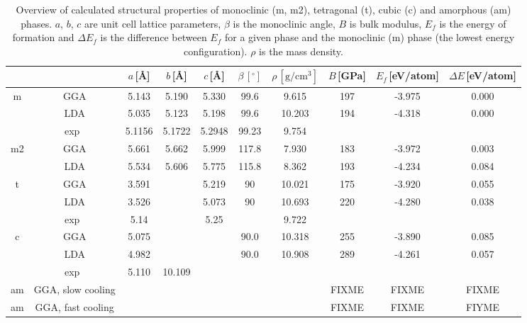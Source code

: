 \documentclass[10pt,a4paper,twocolumn]{article}
\begin{document}
\begin{table}
\begin{center}
\caption{Overview of calculated structural properties of monoclinic (m, m2), tetragonal (t), cubic (c) and amorphous (am) phases. $a$, $b$, $c$ are unit cell lattice parameters, $\beta$ is the monoclinic angle, $B$ is bulk modulus, $E_f$ is the energy of formation and $\Delta E_f$ is the difference between $E_f$ for a given phase and the monoclinic (m) phase (the lowest energy configuration). $\rho$ is the mass density.}
\label{structure}
\begin{tabular}{cccccccccc}

\hline
 & & $a$\,[\AA] & $b$\,[\AA] & $c$\,[\AA] & $\beta\,[^{\circ}]$ & $\rho\,[\mathrm{g/cm^3}]$ & $B$\,[GPa] & $E_f$\,[eV/atom] & $\Delta E$\,[eV/atom]\\
\hline\hline

m & GGA & 5.143 & 5.190 & 5.330 & 99.6 & 9.615 & 197 & -3.975 & 0.000
\\%
  & LDA & 5.035 & 5.123 & 5.198 & 99.6 & 10.203 & 194 & -4.318 & 0.000
\\%
  & exp~\cite{Adam1959} & 5.1156 & 5.1722 & 5.2948 & 99.23 & 9.754 & & & \\
\hline

m2 & GGA & 5.661 & 5.662 & 5.999 & 117.8 & 7.930 & 183 & -3.972 &
0.003\\ %
   & LDA & 5.534 & 5.606 & 5.775 & 115.8 & 8.362 & 193 & -4.234 &
0.084\\ %
\hline

t & GGA & 3.591 & & 5.219 & 90 & 10.021 & 175 & -3.920 & 0.055\\ %
  & LDA & 3.526 & & 5.073 & 90 & 10.693 & 220 & -4.280 & 0.038\\ %
  & exp~\cite{Curtis1954} & 5.14 & & 5.25 & & 9.722 & & & \\
\hline

c & GGA & 5.075 & & & 90.0 & 10.318 & 255 & -3.890 & 0.085 \\%
  & LDA & 4.982 & & & 90.0 & 10.908 & 289 & -4.261 & 0.057 \\%
  & exp~\cite{Senft1983} & 5.110 & 10.109 & & & & & & \\
\hline


am & GGA, slow cooling & & & & &  & FIXME & FIXME & FIXME\\ %
am & GGA, fast cooling & & & & &  & FIXME & FIXME & FIYME\\ %
\hline

\end{tabular}
\end{center}
\end{table}
\end{document}
